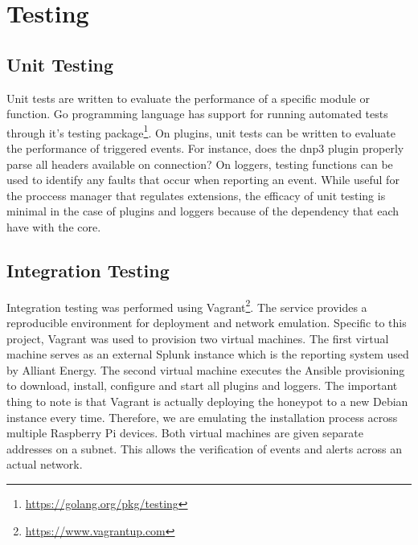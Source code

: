 \chapter{Testing}
\section{Unit Testing}

Unit tests are written to evaluate the performance of a specific module or function. Go programming language has support for running automated tests through it's testing package\footnote{\url{https://golang.org/pkg/testing}}. On plugins, unit tests can be written to evaluate the performance of triggered events. For instance, does the dnp3 plugin properly parse all headers available on connection? On loggers, testing functions can be used to identify any faults that occur when reporting an event. While useful for the proccess manager that regulates extensions, the efficacy of unit testing is minimal in the case of plugins and loggers because of the dependency that each have with the core. 

\section{Integration Testing}

Integration testing was performed using Vagrant\footnote{\url{https://www.vagrantup.com}}. The service provides a reproducible environment for deployment and network emulation. Specific to this project, Vagrant was used to provision two virtual machines. The first virtual machine serves as an external Splunk instance which is the reporting system used by Alliant Energy. The second virtual machine executes the Ansible provisioning to download, install, configure and start all plugins and loggers. The important thing to note is that Vagrant is actually deploying the honeypot to a new Debian instance every time. Therefore, we are emulating the installation process across multiple Raspberry Pi devices. Both virtual machines are given separate addresses on a subnet. This allows the verification of events and alerts across an actual network.
